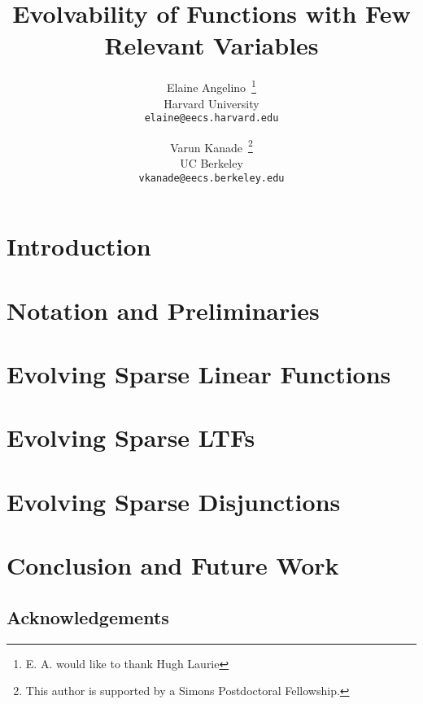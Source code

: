 \documentclass[11pt]{article}
\begin{document}
\title{Evolvability of Functions with Few Relevant Variables}
\author{Elaine Angelino~\thanks{E. A. would like to thank Hugh Laurie} \\
Harvard University \\ \texttt{elaine@eecs.harvard.edu} \and Varun
Kanade~\thanks{This author is supported by a Simons Postdoctoral Fellowship.} \\
UC Berkeley \\ \texttt{vkanade@eecs.berkeley.edu}}

\maketitle

\begin{abstract}

\end{abstract}

\section{Introduction}


\section{Notation and Preliminaries}


\section{Evolving Sparse Linear Functions}


\section{Evolving Sparse LTFs}


\section{Evolving Sparse Disjunctions}


\section{Conclusion and Future Work}


\subsection*{Acknowledgements} 


\nocite{*}

\end{document}
